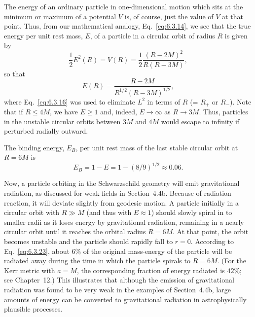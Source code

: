 The energy of an ordinary particle in one-dimensional motion which sits at the
minimum or maximum of a potential \(V\) is, of course, just the value of \(V\) at
that point. Thus, from our mathematical analogy, Eq.~\eqref{eq:6.3.14}, we see
that the true energy per unit rest mass, \(E\), of a particle in a circular orbit
of radius \(R\) is given by
\begin{equation}
  \frac12E^2(R)=V(R)=\frac12\frac{(R-2M)^2}{R(R-3M)},
  \tag{6.3.21}\label{eq:6.3.21}
\end{equation}
so that
\begin{equation}
  E(R)=\frac{R-2M}{R^{1/2}(R-3M)^{1/2}},
  \tag{6.3.22}\label{eq:6.3.22}
\end{equation}
where Eq.~\eqref{eq:6.3.16} was used to eliminate \(L^2\) in terms of \(R\)
(= \(R_+\) or \(R_-\)). Note that if \(R\leq4M\), we have \(E\geq1\) and,
indeed, \(E\to\infty\) as \(R\to3M\). Thus, particles in the unstable circular
orbits between \(3M\) and \(4M\) would escape to infinity if perturbed radially
outward.

The binding energy, \(E_B\), per unit rest mass of the last stable circular orbit
at \(R=6M\) is
\begin{equation}
  E_B=1-E=1-(8/9)^{1/2}\approx0.06.
  \tag{6.3.23}\label{eq:6.3.23}
\end{equation}

Now, a particle orbiting in the Schwarzschild geometry will emit gravitational
radiation, as discussed for weak fields in Section~4.4b. Because of radiation
reaction, it will deviate slightly from geodesic motion. A particle initially in a
circular orbit with \(R\gg M\) (and thus with \(E\approx1\)) should slowly spiral
in to smaller radii as it loses energy by gravitational radiation, remaining in a
nearly circular orbit until it reaches the orbital radius \(R=6M\). At that point,
the orbit becomes unstable and the particle should rapidly fall to \(r=0\).
According to Eq.~\eqref{eq:6.3.23}, about \(6\%\) of the original mass-energy of
the particle will be radiated away during the time in which the particle spirals
to \(R=6M\). (For the Kerr metric with \(a=M\), the corresponding fraction of
energy radiated is \(42\%\); see Chapter~12.) This illustrates that although the
emission of gravitational radiation was found to be very weak in the examples of
Section~4.4b, large amounts of energy can be converted to gravitational radiation
in astrophysically plausible processes.

